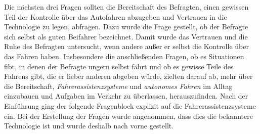 \documentclass[12pt]{article}
\begin{document}
Die nächsten drei Fragen sollten die Bereitschaft des Befragten, einen gewissen Teil der Kontrolle über das Autofahren abzugeben und Vertrauen in die Technologie zu legen, abfragen. Dazu wurde die Frage gestellt, ob  der Befragte sich selbst als guten Beifahrer bezeichnet. Damit wurde das Vertrauen und die Ruhe des Befragten untersucht, wenn andere außer er selbst die Kontrolle über das Fahren haben. Insbesondere die anschließenden Fragen, ob es Situationen fibt, in denen der Befragte ungern selbst fährt und ob es gewisse Teile des Fahrens gibt, die er lieber anderen abgeben würde, zielten darauf ab, mehr über die Bereitschaft, \emph{Fahrerassistenzsysteme}  und \emph{autonomes Fahren} im Alltag einzubauen und Aufgaben im Verkehr zu überlassen, herauszufinden.
Nach der Einführung ging der folgende Fragenblock explizit auf die Fahrerassistenzsysteme ein. Bei der Erstellung der Fragen wurde angenommen, dass dies die bekanntere Technologie ist und wurde deshalb nach vorne gestellt.
\end{document}
